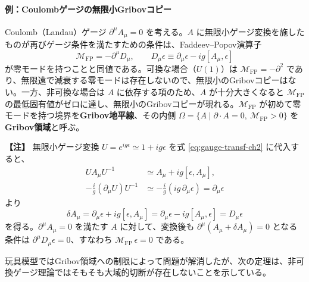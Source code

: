 \documentclass[uplatex, dvipdfmx, book]{jsbook}
\newenvironment{note}{\vspace{1ex}\par\footnotesize\noindent\textbf{【注】}}{\par\vspace{1ex}}
\begin{document}
\paragraph{例：Coulombゲージの無限小Gribovコピー}
Coulomb（Landau）ゲージ $\partial^\mu A_\mu = 0$ を考える。$A$ に無限小ゲージ変換を施したものが再びゲージ条件を満たすための条件は、Faddeev--Popov演算子
\begin{equation}
    \mathcal{M}_{\mathrm{FP}} = -\partial^\mu D_\mu, \qquad D_\mu \epsilon \equiv \partial_\mu \epsilon - ig[A_\mu, \epsilon]
\end{equation}
が零モードを持つことと同値である。可換な場合（$U(1)$）は $\mathcal{M}_{\mathrm{FP}} = -\partial^2$ であり、無限遠で減衰する零モードは存在しないので、無限小のGribovコピーはない。一方、非可換な場合は $A$ に依存する項のため、$A$ が十分大きくなると $\mathcal{M}_{\mathrm{FP}}$ の最低固有値がゼロに達し、無限小のGribovコピーが現れる。$\mathcal{M}_{\mathrm{FP}}$ が初めて零モードを持つ境界を\textbf{Gribov地平線}、その内側 $\Omega = \{ A \mid \partial \cdot A = 0,\ \mathcal{M}_{\mathrm{FP}} > 0 \}$ を\textbf{Gribov領域}と呼ぶ。

\begin{note}
無限小ゲージ変換 $U = e^{ig\epsilon} \simeq 1 + ig\epsilon$ を式 \eqref{eq:gauge-transf-ch2} に代入すると、
\begin{align*}
    U A_\mu U^{-1} &\simeq A_\mu + ig[\epsilon, A_\mu], \\
    -\frac{i}{g}(\partial_\mu U) U^{-1} &\simeq -\frac{i}{g}(ig\,\partial_\mu \epsilon) = \partial_\mu \epsilon
\end{align*}
より
\begin{equation*}
    \delta A_\mu = \partial_\mu \epsilon + ig[\epsilon, A_\mu] = \partial_\mu \epsilon - ig[A_\mu, \epsilon] = D_\mu \epsilon
\end{equation*}
を得る。$\partial^\mu A_\mu = 0$ を満たす $A$ に対して、変換後も $\partial^\mu (A_\mu + \delta A_\mu) = 0$ となる条件は $\partial^\mu D_\mu \epsilon = 0$、すなわち $\mathcal{M}_{\mathrm{FP}}\, \epsilon = 0$ である。
\end{note}

玩具模型ではGribov領域への制限によって問題が解消したが、次の定理\cite{singer1978}は、非可換ゲージ理論ではそもそも大域的切断が存在しないことを示している。
\end{document}
